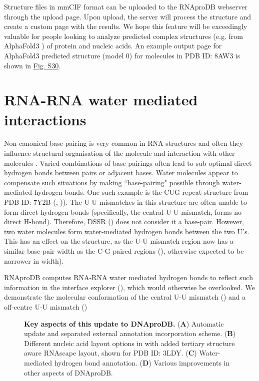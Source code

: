Structure files in mmCIF format can be uploaded to the RNAproDB webserver through the upload page. Upon upload, the server will process the structure and create a custom page with the results. We hope this feature will be exceedingly valuable for people looking to analyze predicted complex structures (e.g. from AlphaFold3 \citep{Abramson2024}) of protein and nucleic acids. An example output page for AlphaFold3 predicted structure (model 0) for molecules in PDB ID: 8AW3 is shown in \hyperref[fig:rnaprodbS2]{Fig. S30}.

\section{RNA-RNA water mediated interactions}

Non-canonical base-pairing is very common in RNA structures and often they influence structural organisation of the molecule and interaction with other molecules \citep{olson2019effects}. Varied combinations of base pairings often lead to sub-optimal direct hydrogen bonds between pairs or adjacent bases. Water molecules appear to compensate such situations by making ``base-pairing" possible through water-mediated hydrogen bonds. One such example is the CUG repeat structure from PDB ID: 7Y2B (\citep{wang2023structural}, )). The U-U mismatches in this structure are often unable to form direct hydrogen bonds (specifically, the central U-U mismatch, forms no direct H-bond). Therefore, DSSR (\citep{Lu2015}) does not consider it a base-pair. However, two water molecules form water-mediated hydrogen bonds between the two U's. This has an effect on the structure, as the U-U mismatch region now has a similar base-pair width as the C-G paired regions (), otherwise expected to be narrower in width). 

RNAproDB computes RNA-RNA water mediated hydrogen bonds to reflect such information in the interface explorer (), which would otherwise be overlooked. We demonstrate the molecular conformation of the central U-U mismatch () and a off-centre U-U mismatch ()

\begin{center}
    \begin{figure}
        \caption[Key aspects of this update to DNAproDB.]{\textbf{Key aspects of this update to DNAproDB.} ({\bf A}) Automatic update and separated external annotation incorporation scheme.  ({\bf B})  Different nucleic acid layout options in with added tertiary structure aware RNAscape layout, shown for PDB ID: 3LDY. ({\bf C}) Water-mediated hydrogen bond annotation. ({\bf D}) Various improvements in other aspects of DNAproDB. }
  \label{fig:rnaprodb3}
\end{figure}
\end{center}